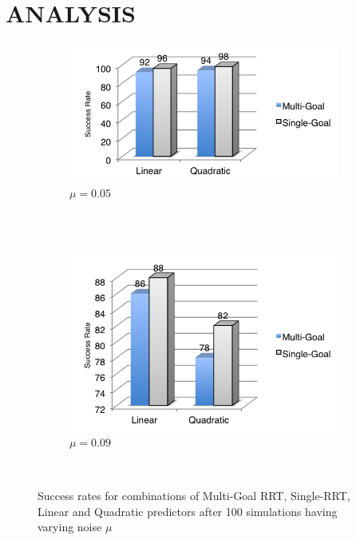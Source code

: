 \documentclass[letterpaper, 10 pt, conference]{ieeeconf}  %
\begin{document}
\section{ANALYSIS}

\begin{figure}
        \centering
        \begin{subfigure}[b]{0.5\textwidth}
                \centering
                \includegraphics[width=\textwidth]{fig/noise-005}
                \caption{$\mu = 0.05$}
                \label{fig:noise-005}
        \end{subfigure}%
        \\
        ~ %
        \begin{subfigure}[b]{0.5\textwidth}
                \centering
                \includegraphics[width=\textwidth]{fig/noise-009}
                \caption{$\mu = 0.09$}
                \label{fig:noise-009}
        \end{subfigure}
        ~ %
        \caption{Success rates for combinations of Multi-Goal RRT, Single-RRT, Linear and Quadratic predictors after 100 simulations having varying noise $\mu$}\label{fig:noise}
\end{figure}
\end{document}
